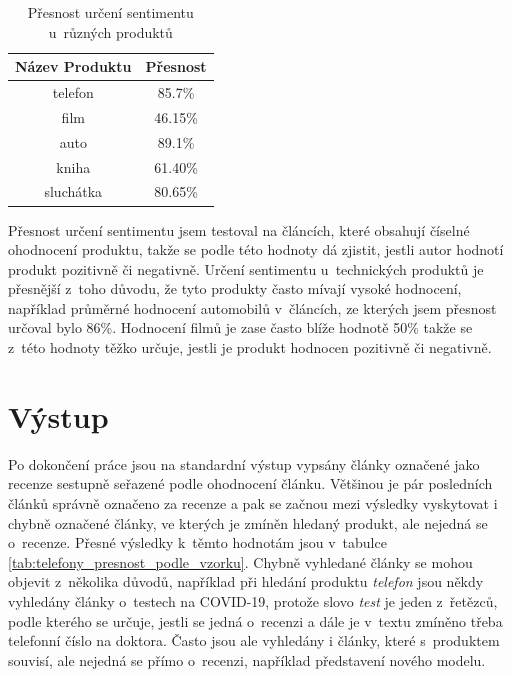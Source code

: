 \begin{table}[h]
    \centering
    \begin{tabular}{|c|c|}
        \hline
        Název Produktu & Přesnost\\
        \hline\hline
        telefon & 85.7\% \\
        \hline
        film & 46.15\% \\
        \hline
        auto & 89.1\% \\
        \hline
        kniha & 61.40\% \\
        \hline
        sluchátka & 80.65\% \\
        \hline
    \end{tabular}
    \caption{Přesnost určení sentimentu u~různých produktů}
    \label{tab:presnost_urceni_sentimentu}
\end{table}

Přesnost určení sentimentu jsem testoval na článcích, které obsahují číselné ohodnocení produktu, takže se podle této hodnoty dá zjistit, jestli autor hodnotí produkt pozitivně či negativně. Určení sentimentu u~technických produktů je přesnější z~toho důvodu, že tyto produkty často mívají vysoké hodnocení, například průměrné hodnocení automobilů v~článcích, ze kterých jsem přesnost určoval bylo 86\%. Hodnocení filmů je zase často blíže hodnotě 50\% takže se z~této hodnoty těžko určuje, jestli je produkt hodnocen pozitivně či negativně.

\section{Výstup}

Po dokončení práce jsou na standardní výstup vypsány články označené jako recenze sestupně seřazené podle ohodnocení článku. Většinou je pár posledních článků správně označeno za recenze a pak se začnou mezi výsledky vyskytovat i chybně označené články, ve kterých je zmíněn hledaný produkt, ale nejedná se o~recenze. Přesné výsledky k~těmto hodnotám jsou v~tabulce \ref{tab:telefony_presnost_podle_vzorku}. Chybně vyhledané články se mohou objevit z~několika důvodů, například při hledání produktu \textit{telefon} jsou někdy vyhledány články o~testech na COVID-19, protože slovo \textit{test} je jeden z~řetězců, podle kterého se určuje, jestli se jedná o~recenzi a dále je v~textu zmíněno třeba telefonní číslo na doktora. Často jsou ale vyhledány i články, které s~produktem souvisí, ale nejedná se přímo o~recenzi, například představení nového modelu.

